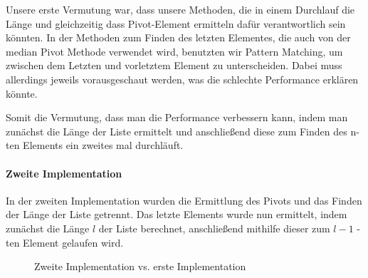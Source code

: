 Unsere erste Vermutung war, dass unsere Methoden, die in einem
Durchlauf die Länge und gleichzeitig dass Pivot-Element ermitteln dafür
verantwortlich sein könnten.
In der Methoden zum Finden des letzten Elementes, die auch von der median
Pivot Methode verwendet wird, benutzten wir Pattern Matching, um zwischen dem
Letzten und vorletztem Element zu unterscheiden.
Dabei muss allerdings jeweils vorausgeschaut werden, was die schlechte
Performance erklären könnte.

Somit die Vermutung, dass man die Performance verbessern kann, indem man
zunächst die Länge der Liste ermittelt und anschließend diese zum Finden des
n-ten Elements ein zweites mal durchläuft.

\paragraph{Zweite Implementation}

In der zweiten Implementation wurden die Ermittlung des Pivots und das Finden
der Länge der Liste getrennt.
Das letzte Elements wurde nun ermittelt, indem zunächst
die Länge \(l\) der Liste berechnet, anschließend mithilfe dieser zum
\(l-1\) -ten Element gelaufen wird.
\begin{figure}[hbt]
    \centering
    \caption{Zweite Implementation vs. erste Implementation}
    \hfill
\end{figure}


